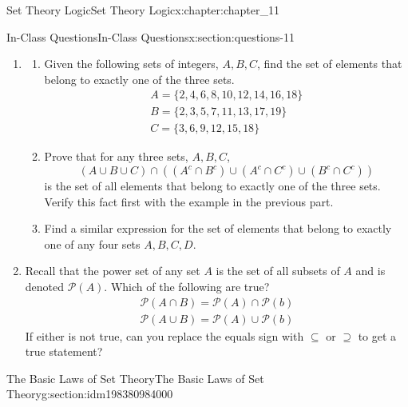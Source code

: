 \documentclass[oneside,10pt,]{book}
\numberwithin{equation}{section}
\begin{document}
\begin{chapterptx}{Set Theory Logic}{}{Set Theory Logic}{}{}{x:chapter:chapter_11}
\begin{sectionptx}{In-Class Questions}{}{In-Class Questions}{}{}{x:section:questions-11}
\begin{enumerate}[label=\arabic*.]
\begin{enumerate}[label=(\alph*)]
\item{}\(A \cup B = A\)%
\item{}\(A\cap B = A\)%
\item{}\(A–B = A\)%
\item{}\(A\cap B = B\cap A\)%
\item{}\(A–B = B–A\)%
\end{enumerate}
%
\item{}%
\begin{enumerate}[label=(\alph*)]
\item{}Given the following sets of integers, \(A, B, C\), find the set of elements that belong to exactly one of the three sets.%
\begin{gather*}
A=\{2,4,6,8,10,12,14,16,18\}\\
B=\{2,3,5,7,11,13,17,19\}\\
C=\{3,6,9,12,15,18\}
\end{gather*}
%
\item{}Prove that for any three sets, \(A, B, C\),%
\begin{equation*}
(A \cup B \cup C)\cap ((A^c \cap B^c)\cup (A^c \cap C^c)\cup (B^c \cap C^c))
\end{equation*}
is the set of all elements that belong to exactly one of the three sets.  Verify this fact first with the example in the previous part.%
\item{}Find a similar expression for the set of elements that belong to exactly one of any four sets \(A, B, C, D.\)%
\end{enumerate}
%
\item{}Recall that the power set of any set \(A\) is the set of all subsets of \(A\) and is denoted \(\mathcal{P}(A)\).  Which of the following are true?%
\begin{gather*}
\mathcal{P}(A \cap B) = \mathcal{P}(A) \cap \mathcal{P}(b)\\
\mathcal{P}(A \cup B) = \mathcal{P}(A) \cup \mathcal{P}(b)
\end{gather*}
If either is not true, can you replace the equals sign with \(\subseteq\) or \(\supseteq\) to get a true statement?%
\end{enumerate}
%
\end{sectionptx}
%
%
\typeout{************************************************}
\typeout{************************************************}
%
\begin{sectionptx}{The Basic Laws of Set Theory}{}{The Basic Laws of Set Theory}{}{}{g:section:idm198380984000}

\end{sectionptx}
\end{chapterptx}
\end{document}

